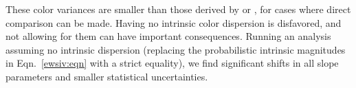 \documentclass{aastex61}   	%
\begin{document}
These color variances are smaller than those derived by \citet{2003A&A...404..901N} or \citet{2007ApJ...659..122J}, for cases where direct comparison can be made.
\color{purple}
Having no intrinsic color dispersion is disfavored, and not allowing for them can have important consequences.  Running an analysis assuming no intrinsic dispersion (replacing the probabilistic intrinsic magnitudes in Eqn.~\ref{ewsiv:eqn}
with a strict equality), we find significant shifts in all slope parameters  and smaller statistical uncertainties.
\color{black}
\end{document}

